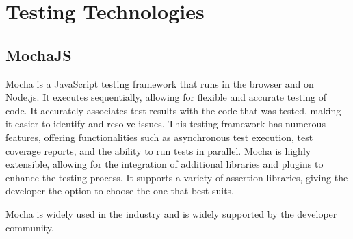 \section{Testing Technologies}

\subsection{MochaJS}

Mocha is a JavaScript testing framework that runs in the browser and on Node.js. It executes sequentially, allowing for flexible and accurate testing of code. It accurately 
associates test results with the code that was tested, making it easier to identify and resolve issues. 
This testing framework has numerous features, offering functionalities such as asynchronous test execution, test coverage reports, and the ability to run tests in parallel.
Mocha is highly extensible, allowing for the integration of additional libraries and plugins to enhance the testing process. It supports a
variety of assertion libraries, giving the developer the option to choose the one that best suits. 

Mocha is widely used in the industry and is widely supported by the developer community. \cite{mocha}


